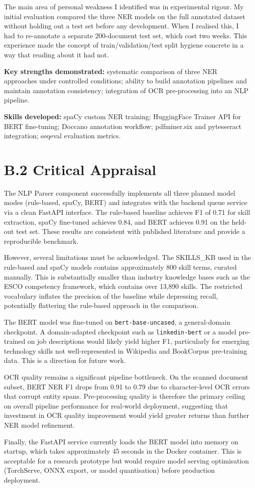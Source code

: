 The main area of personal weakness I identified was in experimental rigour. My initial evaluation compared the three NER models on the full annotated dataset without holding out a test set before any development. When I realised this, I had to re-annotate a separate 200-document test set, which cost two weeks. This experience made the concept of train/validation/test split hygiene concrete in a way that reading about it had not.

\textbf{Key strengths demonstrated:} systematic comparison of three NER approaches under controlled conditions; ability to build annotation pipelines and maintain annotation consistency; integration of OCR pre-processing into an NLP pipeline.

\textbf{Skills developed:} spaCy custom NER training; HuggingFace Trainer API for BERT fine-tuning; Doccano annotation workflow; pdfminer.six and pytesseract integration; seqeval evaluation metrics.

\section*{B.2 Critical Appraisal}

The NLP Parser component successfully implements all three planned model modes (rule-based, spaCy, BERT) and integrates with the backend queue service via a clean FastAPI interface. The rule-based baseline achieves F1 of 0.71 for skill extraction, spaCy fine-tuned achieves 0.84, and BERT achieves 0.91 on the held-out test set. These results are consistent with published literature and provide a reproducible benchmark.

However, several limitations must be acknowledged. The SKILLS\_KB used in the rule-based and spaCy models contains approximately 800 skill terms, curated manually. This is substantially smaller than industry knowledge bases such as the ESCO competency framework, which contains over 13,890 skills. The restricted vocabulary inflates the precision of the baseline while depressing recall, potentially flattering the rule-based approach in the comparison.

The BERT model was fine-tuned on \texttt{bert-base-uncased}, a general-domain checkpoint. A domain-adapted checkpoint such as \texttt{linkedin-bert} or a model pre-trained on job descriptions would likely yield higher F1, particularly for emerging technology skills not well-represented in Wikipedia and BookCorpus pre-training data. This is a direction for future work.

OCR quality remains a significant pipeline bottleneck. On the scanned document subset, BERT NER F1 drops from 0.91 to 0.79 due to character-level OCR errors that corrupt entity spans. Pre-processing quality is therefore the primary ceiling on overall pipeline performance for real-world deployment, suggesting that investment in OCR quality improvement would yield greater returns than further NER model refinement.

Finally, the FastAPI service currently loads the BERT model into memory on startup, which takes approximately 45 seconds in the Docker container. This is acceptable for a research prototype but would require model serving optimisation (TorchServe, ONNX export, or model quantisation) before production deployment.
